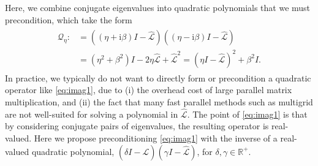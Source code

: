 \documentclass[a4paper,10pt]{article}
\begin{document}
Here, we combine conjugate eigenvalues into quadratic polynomials
that we must precondition, which take the form 
%
\begin{align}\label{eq:imag1}
\begin{split}
\mathcal{Q}_\eta :&= ((\eta + \mathrm{i}\beta)I -
	\widehat{\mathcal{L}})((\eta - \mathrm{i}\beta)I - \widehat{\mathcal{L}}) \\
& = (\eta^2+\beta^2)I - 2\eta \widehat{\mathcal{L}} + \widehat{\mathcal{L}}^2
= (\eta I - \widehat{\mathcal{L}})^2 + \beta^2I.
\end{split}
\end{align}
%
In practice, we typically do not want to directly form or precondition a quadratic
operator like \eqref{eq:imag1}, due to (i) the overhead cost of large parallel matrix
multiplication, and (ii) the fact that many fast parallel methods such as multigrid are not well-suited for solving a polynomial in $\widehat{\mathcal{L}}$. The point of \eqref{eq:imag1}
is that by considering conjugate pairs of eigenvalues, the resulting operator is real-valued.
Here we propose preconditioning \eqref{eq:imag1} with the inverse of a
real-valued quadratic polynomial, $(\delta I - \widehat{\mathcal{L}})
(\gamma I - \widehat{\mathcal{L}})$, for $\delta,\gamma \in\mathbb{R}^+$.
\end{document}
